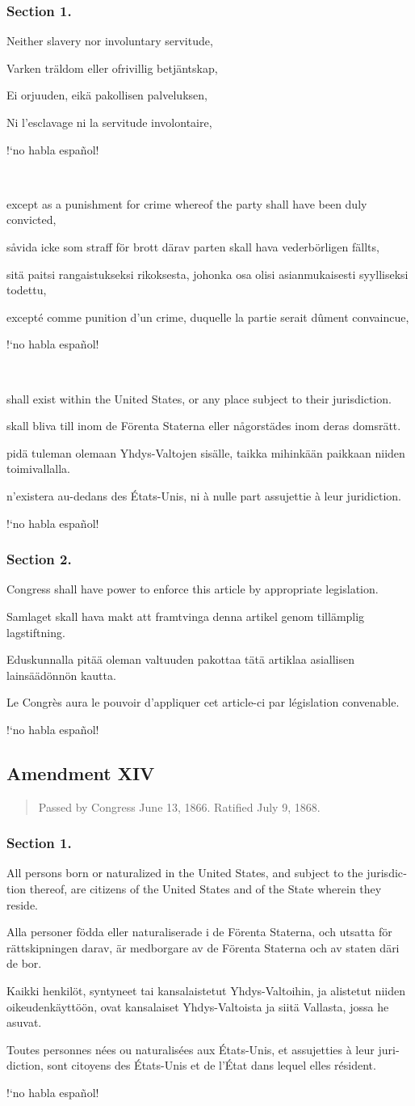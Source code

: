 \documentclass[a4paper,landscape,10pt]{article}
\newcommand{\tblock}[5]{\noindent\begin{minipage}[t]{0.18\textwidth}\foreignlanguage{english}{#1}\end{minipage}\hskip 0.025\textwidth\begin{minipage}[t]{0.18\textwidth}\foreignlanguage{swedish}{#2}\end{minipage}\hskip 0.025\textwidth\begin{minipage}[t]{0.18\textwidth}\foreignlanguage{finnish}{#3}\end{minipage}\hskip 0.025\textwidth\begin{minipage}[t]{0.18\textwidth}\foreignlanguage{french}{#4}\end{minipage}\hskip 0.025\textwidth\begin{minipage}[t]{0.18\textwidth}\foreignlanguage{spanish}{#5}\end{minipage}}
\begin{document}
\subsubsection*{Section 1.}
\tblock
{Neither slavery nor involuntary servitude,}
{Varken träldom eller ofrivillig betjäntskap,}
{Ei orjuuden, eikä pakollisen palveluksen,}
{Ni l'esclavage ni la servitude involontaire,}
{!`no habla español!}

~

\tblock
{except as a punishment for crime whereof the party shall have been duly convicted,}
{såvida icke som straff för brott därav parten skall hava vederbörligen fällts,}
{sitä paitsi rangaistukseksi rikoksesta, johonka osa olisi asianmukaisesti syylliseksi todettu,}
{excepté comme punition d'un crime, duquelle la partie serait dûment convaincue,}
{!`no habla español!}

~

\tblock
{shall exist within the United States, or any place subject to their jurisdiction.}
{skall bliva till inom de Förenta Staterna eller någorstädes inom deras domsrätt.}
{pidä tuleman olemaan Yhdys-Valtojen sisälle, taikka mihinkään paikkaan niiden toimivallalla.}
{n'existera au-dedans des États-Unis, ni à nulle part assujettie à leur juridiction.}
{!`no habla español!}


\subsubsection*{Section 2.}
\tblock
{Congress shall have power to enforce this article by appropriate legislation.}
{Samlaget skall hava makt att framtvinga denna artikel genom tillämplig lagstiftning.}
{Eduskunnalla pitää oleman valtuuden pakottaa tätä artiklaa asiallisen lainsäädönnön kautta.}
{Le Congrès aura le pouvoir d'appliquer cet article-ci par législation convenable.}
{!`no habla español!}



\subsection*{Amendment XIV}
\begin{quote}\small
	Passed by Congress June 13, 1866. Ratified July 9, 1868.
\end{quote}
\subsubsection*{Section 1.}
\tblock
{All persons born or naturalized in the United States, and subject to the jurisdiction thereof, are citizens of the United States and of the State wherein they reside.}
{Alla personer födda eller naturaliserade i de Förenta Staterna, och utsatta för rättskipningen darav, är medborgare av de Förenta Staterna och av staten däri de bor.}
{Kaikki henkilöt, syntyneet tai kansalaistetut Yhdys-Valtoihin, ja alistetut niiden oikeudenkäyttöön, ovat kansalaiset Yhdys-Valtoista ja siitä Vallasta, jossa he asuvat.}
{Toutes personnes nées ou naturalisées aux États-Unis, et assujetties à leur juridiction, sont citoyens des États-Unis et de l'État dans lequel elles résident.}
{!`no habla español!}
\end{document}
